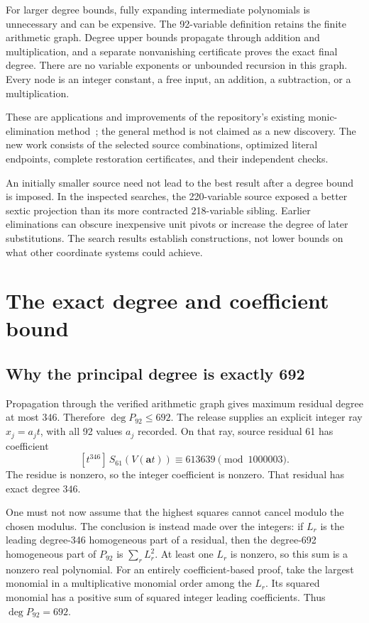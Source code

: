 \documentclass[11pt]{article}
\begin{document}
For larger degree bounds, fully expanding intermediate polynomials
is unnecessary and can be expensive. The 92-variable definition retains
the finite arithmetic graph. Degree upper bounds propagate through
addition and multiplication, and a separate nonvanishing certificate
proves the exact final degree. There are no variable exponents or
unbounded recursion in this graph. Every node is an integer constant,
a free input, an addition, a subtraction, or a multiplication.

These are applications and improvements of the repository's existing
monic-elimination method~\cite{p152,p159}; the general method is not
claimed as a new discovery. The new work consists of the selected
source combinations, optimized literal endpoints, complete restoration
certificates, and their independent checks.

An initially smaller source need not lead to the best result after a
degree bound is imposed. In the inspected searches, the 220-variable
source exposed a better sextic projection than its more contracted
218-variable sibling. Earlier eliminations can obscure inexpensive
unit pivots or increase the degree of later substitutions. The search
results establish constructions, not lower bounds on what other
coordinate systems could achieve.

\section{The exact degree and coefficient bound}\label{sec:degree}

\subsection{Why the principal degree is exactly 692}

Propagation through the verified arithmetic graph gives maximum
residual degree at most $346$. Therefore $\deg P_{92}\le692$.
The release supplies an explicit integer ray
$x_j=a_jt$, with all 92 values $a_j$ recorded. On that ray, source
residual 61 has coefficient
\[
 [t^{346}]\,S_{61}(V(\boldsymbol a t))
          \equiv 613639\pmod{1000003}.
\]
The residue is nonzero, so the integer coefficient is nonzero.
That residual has exact degree $346$.

One must not now assume that the highest squares cannot cancel modulo
the chosen modulus. The conclusion is instead made over the integers:
if $L_r$ is the leading degree-346 homogeneous part of a residual, then
the degree-692 homogeneous part of $P_{92}$ is $\sum_r L_r^2$.
At least one $L_r$ is nonzero, so this sum is a nonzero real polynomial.
For an entirely coefficient-based proof, take the largest monomial in
a multiplicative monomial order among the $L_r$. Its squared monomial
has a positive sum of squared integer leading coefficients.
Thus $\deg P_{92}=692$.
\end{document}
